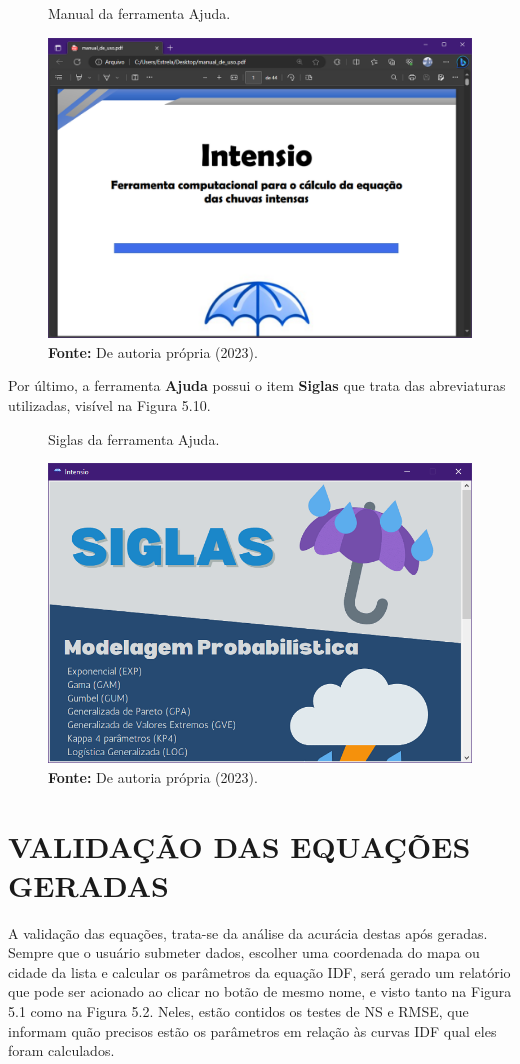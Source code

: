 \begin{figure}[!ht]
	\centering
	\caption{Manual da ferramenta Ajuda.}
	\includegraphics[width=.7625\linewidth]{figuras/manual.png}
	\caption*{\textbf{Fonte:} De autoria própria (2023).}
	\label{fig:figuras/manual.png}
\end{figure}

Por último, a ferramenta \textbf{Ajuda} possui o item \textbf{Siglas} que trata das abreviaturas utilizadas, visível na Figura 5.10.

\begin{figure}[!ht]
	\centering
	\caption{Siglas da ferramenta Ajuda.}
	\includegraphics[width=.7625\linewidth]{figuras/siglas.png}
	\caption*{\textbf{Fonte:} De autoria própria (2023).}
	\label{fig:figuras/siglas.png}
\end{figure}

\newpage

\section{VALIDAÇÃO DAS EQUAÇÕES GERADAS}

A validação das equações, trata-se da análise da acurácia destas após geradas. Sempre que o usuário submeter dados, escolher uma coordenada do mapa ou cidade da lista e calcular os parâmetros da equação IDF, será gerado um relatório que pode ser acionado ao clicar no botão de mesmo nome, e visto tanto na Figura 5.1 como na Figura 5.2. Neles, estão contidos os testes de NS e RMSE, que informam quão precisos estão os parâmetros em relação às curvas IDF qual eles foram calculados.

